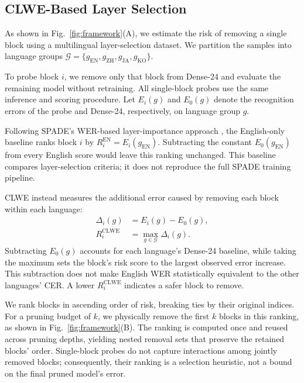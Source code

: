 \documentclass{article}
\begin{document}
\subsection{CLWE-Based Layer Selection}
\label{sec:clwe_selection}

As shown in Fig.~\ref{fig:framework}(A), we estimate the risk of
removing a single block using a multilingual layer-selection dataset.
We partition the samples into language groups
$\mathcal{G}=\{g_{\mathrm{EN}},g_{\mathrm{ZH}},
g_{\mathrm{JA}},g_{\mathrm{KO}}\}$.

To probe block $i$, we remove only that block from Dense-24 and
evaluate the remaining model without retraining. All single-block
probes use the same inference and scoring procedure. Let $E_i(g)$
and $E_0(g)$ denote the recognition errors of the probe and
Dense-24, respectively, on language group $g$.

Following SPADE's WER-based layer-importance approach
\cite{nguyen2026spade}, the English-only baseline ranks block $i$ by
$R_i^{\mathrm{EN}}=E_i(g_{\mathrm{EN}})$. Subtracting the constant
$E_0(g_{\mathrm{EN}})$ from every English score would leave this
ranking unchanged. This baseline compares layer-selection criteria;
it does not reproduce the full SPADE training pipeline.

CLWE instead measures the additional error caused by removing each
block within each language:
\begingroup
\setlength{\abovedisplayskip}{3pt}
\setlength{\abovedisplayshortskip}{3pt}
\setlength{\belowdisplayskip}{3pt}
\setlength{\belowdisplayshortskip}{3pt}
\begin{equation}
\begin{aligned}
\Delta_i(g) &= E_i(g)-E_0(g),\\
R_i^{\mathrm{CLWE}}
&= \max_{g\in\mathcal{G}}\Delta_i(g).
\end{aligned}
\label{eq:clwe_risk}
\end{equation}
\endgroup
Subtracting $E_0(g)$ accounts for each language's Dense-24 baseline,
while taking the maximum sets the block's risk score to the largest
observed error increase. This subtraction does not make English WER
statistically equivalent to the other languages' CER. A lower
$R_i^{\mathrm{CLWE}}$ indicates a safer block to remove.

We rank blocks in ascending order of risk, breaking ties by their
original indices. For a pruning budget of $k$, we physically remove
the first $k$ blocks in this ranking, as shown in
Fig.~\ref{fig:framework}(B). The ranking is computed once and reused
across pruning depths, yielding nested removal sets that preserve
the retained blocks' order. Single-block probes do not
capture interactions among jointly removed blocks; consequently,
their ranking is a selection heuristic, not a bound on the final
pruned model's error.
\end{document}
